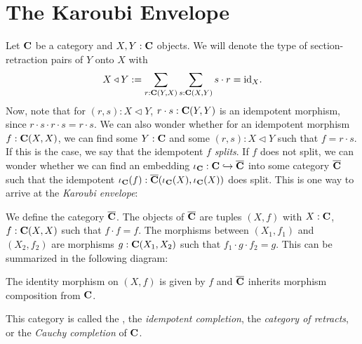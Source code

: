 \section{The Karoubi Envelope}\label{sec:karoubi-envelope}
Let $ \mathbf{C} $ be a category and $ X, Y : \mathbf{C} $ objects. We will denote the type of section-retraction pairs of $ Y $ onto $ X $ with
\[ X \triangleleft Y := \sum_{r : \mathbf{C}(Y, X)} \sum_{s : \mathbf{C}(X, Y)} s \cdot r = \text{id}_{X}. \]
Now, note that for $ (r, s) : X \triangleleft Y $, $ r \cdot s: \mathbf{C}(Y, Y) $ is an idempotent morphism, since $ r \cdot s \cdot r \cdot s = r \cdot s $. We can also wonder whether for an idempotent morphism $ f: \mathbf{C}(X, X) $, we can find some $ Y : \mathbf{C} $ and some $ (r, s) : X \triangleleft Y $ such that $ f = r \cdot s $. If this is the case, we say that the idempotent $ f $ \textit{splits}. If $ f $ does not split, we can wonder whether we can find an embedding $ \iota_{\mathbf{C}} : \mathbf{C} \hookrightarrow \overline {\mathbf{C}} $ into some category $ \overline {\mathbf{C}} $ such that the idempotent $ \iota_{\mathbf{C}}(f): \overline {\mathbf{C}}(\iota_{\mathbf{C}}(X), \iota_{\mathbf{C}}(X)) $ does split. This is one way to arrive at the \textit{Karoubi envelope}:

\begin{definition}\label{def:karoubi}
  We define the category $ \overline {\mathbf{C}} $. The objects of $ \overline {\mathbf{C}} $ are tuples $ (X, f) $ with $ X: \mathbf{C} $, $ f: \mathbf{C}(X, X) $ such that $ f \cdot f = f $. The morphisms between $ (X_1, f_1) $ and $ (X_2, f_2) $ are morphisms $ g: \mathbf{C}(X_1, X_2) $ such that $ f_1 \cdot g \cdot f_2 = g $. This can be summarized in the following diagram:
  \begin{center}
  \end{center}
  The identity morphism on $ (X, f) $ is given by $ f $ and $ \overline {\mathbf{C}} $ inherits morphism composition from $ \mathbf{C} $.
\end{definition}
This category is called the , the \textit{idempotent completion}, the \textit{category of retracts}, or the \textit{Cauchy completion} of $ \mathbf{C} $.

